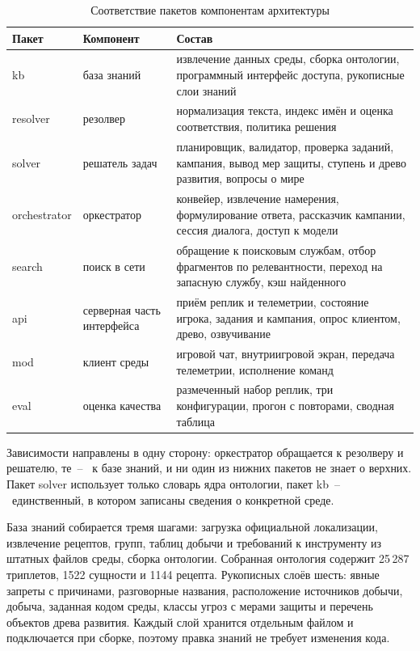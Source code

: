 \begin{table}[!htb]
  \centering
  \caption{Соответствие пакетов компонентам архитектуры}
  \label{tab:packages}
  \begin{tabular}{|>{\raggedright\arraybackslash}p{}
                  |>{\raggedright\arraybackslash}p{}
                  |>{\raggedright\arraybackslash}p{}|}
    \hline
    Пакет & Компонент & Состав \\
    \hline
    kb & база знаний & извлечение данных среды, сборка онтологии, программный интерфейс доступа, рукописные слои знаний \\
    \hline
    resolver & резолвер & нормализация текста, индекс имён и оценка соответствия, политика решения \\
    \hline
    solver & решатель задач & планировщик, валидатор, проверка заданий, кампания, вывод мер защиты, ступень и древо развития, вопросы о мире \\
    \hline
    orchestrator & оркестратор & конвейер, извлечение намерения, формулирование ответа, рассказчик кампании, сессия диалога, доступ к модели \\
    \hline
    search & поиск в сети & обращение к поисковым службам, отбор фрагментов по релевантности, переход на запасную службу, кэш найденного \\
    \hline
    api & серверная часть интерфейса & приём реплик и телеметрии, состояние игрока, задания и кампания, опрос клиентом, древо, озвучивание \\
    \hline
    mod & клиент среды & игровой чат, внутриигровой экран, передача телеметрии, исполнение команд \\
    \hline
    eval & оценка качества & размеченный набор реплик, три конфигурации, прогон с повторами, сводная таблица \\
    \hline
  \end{tabular}
\end{table}

Зависимости направлены в одну сторону: оркестратор обращается к резолверу и решателю, те~--~
к базе знаний, и ни один из нижних пакетов не знает о верхних. Пакет solver использует
только словарь ядра онтологии, пакет kb~--~единственный, в котором записаны сведения о
конкретной среде.

{ База знаний собирается тремя шагами: загрузка официальной локализации, извлечение
рецептов, групп, таблиц добычи и требований к инструменту из штатных файлов среды,
сборка онтологии. Собранная онтология содержит 25\,287 триплетов, 1522 сущности и
1144 рецепта. Рукописных слоёв шесть: явные запреты с причинами, разговорные названия,
расположение источников добычи, добыча, заданная кодом среды, классы угроз с мерами
защиты и перечень объектов древа развития. Каждый слой хранится отдельным файлом и подключается при сборке, поэтому
правка знаний не требует изменения кода.\par}

